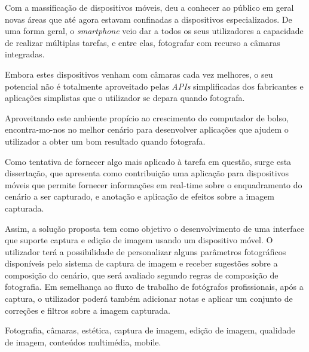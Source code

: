 \abstractPT 

Com a massificação de dispositivos móveis, deu a conhecer ao público em geral novas áreas que até agora estavam confinadas a dispositivos especializados. De uma forma geral, o \emph{smartphone} veio dar a todos os seus utilizadores a capacidade de realizar múltiplas tarefas, e entre elas, fotografar com recurso a câmaras integradas.


Embora estes dispositivos venham com câmaras cada vez melhores, o seu potencial não é totalmente aproveitado pelas \emph{APIs} simplificadas dos fabricantes e aplicações simplistas que o utilizador se depara quando fotografa.


Aproveitando este ambiente propício ao crescimento do computador de bolso, encontra-mo-nos no melhor cenário para desenvolver aplicações que ajudem o utilizador a obter um bom resultado quando fotografa.


Como tentativa de fornecer algo mais aplicado à tarefa em questão, surge esta dissertação, que apresenta como contribuição uma aplicação para dispositivos móveis que permite fornecer informações em real-time sobre o enquadramento do cenário a ser capturado, e anotação e aplicação de efeitos sobre a imagem capturada.



Assim, a solução proposta tem como objetivo o desenvolvimento de uma interface que suporte captura e edição de imagem usando um dispositivo móvel. O utilizador terá a possibilidade de personalizar alguns parâmetros fotográficos disponíveis pelo sistema de captura de imagem e receber sugestões sobre a composição do cenário, que será avaliado segundo regras de composição de fotografia. Em semelhança ao fluxo de trabalho de fotógrafos profissionais, após a captura, o utilizador poderá também adicionar notas e aplicar um conjunto de correções e filtros sobre a imagem capturada.

\begin{keywords}
Fotografia, câmaras, estética, captura de imagem, edição de imagem, qualidade de imagem, conteúdos multimédia, mobile.
\end{keywords}
